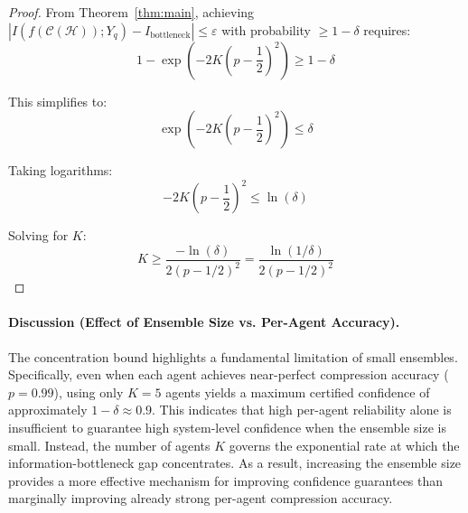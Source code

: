 \documentclass{article}
\theoremstyle{plain}
\theoremstyle{definition}
\theoremstyle{remark}
\begin{document}
\begin{proof}
From Theorem~\ref{thm:main}, achieving $|I(f(\mathcal{C}(\mathcal{H})); Y_q) - I_{\text{bottleneck}}| \leq \varepsilon$ with probability $\geq 1 - \delta$ requires:
\begin{equation}
1 - \exp\left(-2K\left(p - \frac{1}{2}\right)^2\right) \geq 1 - \delta
\end{equation}

This simplifies to:
\begin{equation}
\exp\left(-2K\left(p - \frac{1}{2}\right)^2\right) \leq \delta
\end{equation}

Taking logarithms:
\begin{equation}
-2K\left(p - \frac{1}{2}\right)^2 \leq \ln(\delta)
\end{equation}

Solving for $K$:
\begin{equation}
K \geq \frac{-\ln(\delta)}{2(p - 1/2)^2} = \frac{\ln(1/\delta)}{2(p - 1/2)^2}
\end{equation}



\end{proof}

\paragraph{Discussion (Effect of Ensemble Size vs. Per-Agent Accuracy).}
The concentration bound highlights a fundamental limitation of small ensembles. 
Specifically, even when each agent achieves near-perfect compression accuracy 
(\(p = 0.99\)), using only \(K = 5\) agents yields a maximum certified confidence of 
approximately \(1-\delta \approx 0.9\). 
This indicates that high per-agent reliability alone is insufficient to guarantee 
high system-level confidence when the ensemble size is small. 
Instead, the number of agents \(K\) governs the exponential rate at which the 
information-bottleneck gap concentrates. 
As a result, increasing the ensemble size provides a more effective mechanism for 
improving confidence guarantees than marginally improving already strong per-agent 
compression accuracy.
\end{document}
